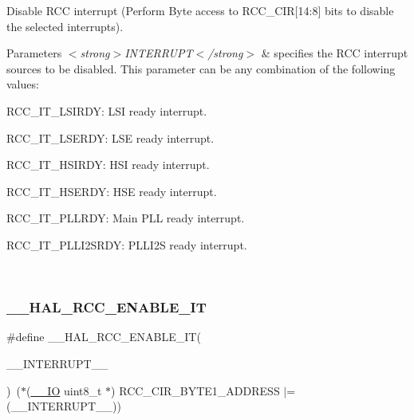 Disable R\+CC interrupt (Perform Byte access to R\+C\+C\+\_\+\+C\+IR\mbox{[}14\+:8\mbox{]} bits to disable the selected interrupts). 


\begin{DoxyParams}{Parameters}
{\em $<$strong$>$\+I\+N\+T\+E\+R\+R\+U\+P\+T$<$/strong$>$} & specifies the R\+CC interrupt sources to be disabled. This parameter can be any combination of the following values\+: \begin{DoxyItemize}
\item R\+C\+C\+\_\+\+I\+T\+\_\+\+L\+S\+I\+R\+DY\+: L\+SI ready interrupt. \item R\+C\+C\+\_\+\+I\+T\+\_\+\+L\+S\+E\+R\+DY\+: L\+SE ready interrupt. \item R\+C\+C\+\_\+\+I\+T\+\_\+\+H\+S\+I\+R\+DY\+: H\+SI ready interrupt. \item R\+C\+C\+\_\+\+I\+T\+\_\+\+H\+S\+E\+R\+DY\+: H\+SE ready interrupt. \item R\+C\+C\+\_\+\+I\+T\+\_\+\+P\+L\+L\+R\+DY\+: Main P\+LL ready interrupt. \item R\+C\+C\+\_\+\+I\+T\+\_\+\+P\+L\+L\+I2\+S\+R\+DY\+: P\+L\+L\+I2S ready interrupt. \end{DoxyItemize}
\\
\hline
\end{DoxyParams}
\mbox{\label{group___r_c_c___flags___interrupts___management_ga180fb20a37b31a6e4f7e59213a6c0405}} 
\subsubsection{\texorpdfstring{\+\_\+\+\_\+\+H\+A\+L\+\_\+\+R\+C\+C\+\_\+\+E\+N\+A\+B\+L\+E\+\_\+\+IT}{\_\_HAL\_RCC\_ENABLE\_IT}}
{\footnotesize\ttfamily \#define \+\_\+\+\_\+\+H\+A\+L\+\_\+\+R\+C\+C\+\_\+\+E\+N\+A\+B\+L\+E\+\_\+\+IT(\begin{DoxyParamCaption}\item[{}]{\+\_\+\+\_\+\+I\+N\+T\+E\+R\+R\+U\+P\+T\+\_\+\+\_\+ }\end{DoxyParamCaption})~($\ast$(\hyperlink{core__sc300_8h_aec43007d9998a0a0e01faede4133d6be}{\+\_\+\+\_\+\+IO} uint8\+\_\+t $\ast$) R\+C\+C\+\_\+\+C\+I\+R\+\_\+\+B\+Y\+T\+E1\+\_\+\+A\+D\+D\+R\+E\+SS $\vert$= (\+\_\+\+\_\+\+I\+N\+T\+E\+R\+R\+U\+P\+T\+\_\+\+\_\+))}



